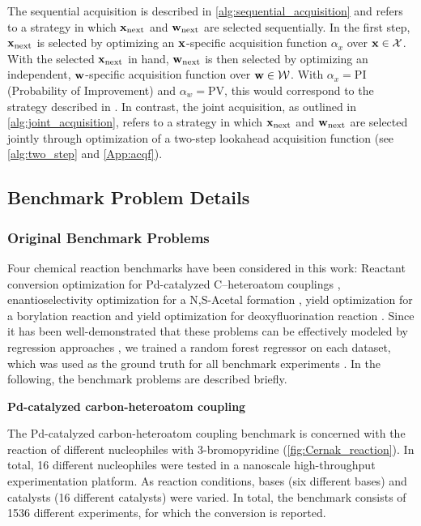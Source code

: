 The sequential acquisition is described in \cref{alg:sequential_acquisition} and refers to a strategy in which ${\mathbf{x}}_{\text{next}}$ and ${\mathbf{w}}_{\text{next}}$ are selected sequentially. In the first step, ${\mathbf{x}}_{\text{next}}$ is selected by optimizing an ${\mathbf{x}}$-specific acquisition function $\alpha_x$ over ${\mathbf{x}} \in \mathcal{X}$. With the selected ${\mathbf{x}}_{\text{next}}$ in hand, ${\mathbf{w}}_{\text{next}}$ is then selected by optimizing an independent, ${\mathbf{w}}$-specific acquisition function over ${\mathbf{w}} \in \mathcal{W}$. With $\alpha_x = \text{PI}$ (Probability of Improvement) and $\alpha_w = \text{PV}$, this would correspond to the strategy described in \citep{angello_closed-loop_2022}. 
In contrast, the joint acquisition, as outlined in \cref{alg:joint_acquisition}, refers to a strategy in which ${\mathbf{x}}_{\text{next}}$ and ${\mathbf{w}}_{\text{next}}$ are selected jointly through optimization of a two-step lookahead acquisition function (see \cref{alg:two_step} and \cref{App:acqf}).
\newpage
\subsection{Benchmark Problem Details} \label{subsec:problem_details}

\subsubsection{Original Benchmark Problems}

Four chemical reaction benchmarks have been considered in this work: Reactant conversion optimization for Pd-catalyzed C–heteroatom couplings \citep{buitrago_santanilla_nanomole-scale_2015}, enantioselectivity optimization for a N,S-Acetal formation \citep{zahrt_prediction_2019}, yield optimization for a borylation reaction \citep{stevens_advancing_2022, wang_identifying_2024} and yield optimization for deoxyfluorination reaction \citep{nielsen_deoxyfluorination_2018, wang_identifying_2024}. 
Since it has been well-demonstrated that these problems can be effectively modeled by regression approaches \citep{zahrt_prediction_2019, ahneman_predicting_2018, sandfort_structure-based_2020}, we trained a random forest regressor on each dataset, which was used as the ground truth for all benchmark experiments \citep{hase_olympus_2021}.
In the following, the benchmark problems are described briefly.

\textbf{Pd-catalyzed carbon-heteroatom coupling}

The Pd-catalyzed carbon-heteroatom coupling benchmark is concerned with the reaction of different nucleophiles with 3-bromopyridine (\cref{fig:Cernak_reaction}). 
In total, 16 different nucleophiles were tested in a nanoscale high-throughput experimentation platform. 
As reaction conditions, bases (six different bases) and catalysts (16 different catalysts) were varied. 
In total, the benchmark consists of 1536 different experiments, for which the conversion is reported.

